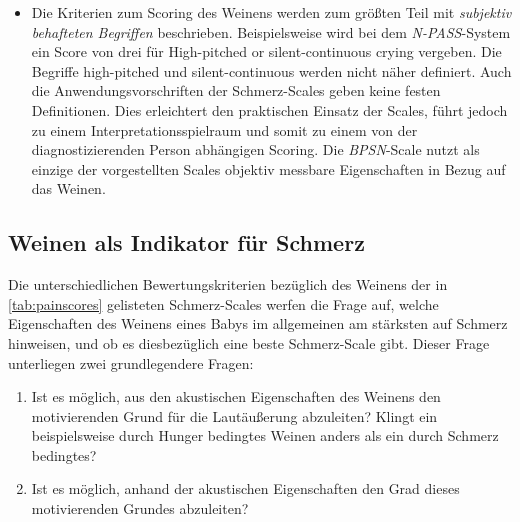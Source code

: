 \begin{itemize}
	\item Die Kriterien zum Scoring des Weinens werden zum größten Teil mit \emph{subjektiv behafteten Begriffen} beschrieben. Beispielsweise wird bei dem \emph{N-PASS}-System ein Score von drei für \glqq High-pitched or silent-continuous crying\grqq{} vergeben. Die Begriffe \glqq high-pitched\grqq{} und \glqq silent-continuous\grqq{} werden nicht näher definiert. Auch die Anwendungsvorschriften der Schmerz-Scales geben keine festen Definitionen. Dies erleichtert den praktischen Einsatz der Scales, führt jedoch zu einem Interpretationsspielraum und somit zu einem von der diagnostizierenden Person abhängigen Scoring. Die \emph{BPSN}-Scale nutzt als einzige der vorgestellten Scales objektiv messbare Eigenschaften in Bezug auf das Weinen.
	
	
\end{itemize}


\subsection{Weinen als Indikator für Schmerz}
\label{sec:foundations_cryingMeta}

Die unterschiedlichen Bewertungskriterien bezüglich des Weinens der in \autoref{tab:painscores} gelisteten Schmerz-Scales werfen die Frage auf, welche Eigenschaften des Weinens eines Babys im allgemeinen am stärksten auf Schmerz hinweisen, und ob es diesbezüglich eine \glqq beste\grqq{} Schmerz-Scale gibt. Dieser Frage unterliegen zwei grundlegendere Fragen:

\begin{enumerate}
	\item Ist es möglich, aus den akustischen Eigenschaften des Weinens den motivierenden Grund für die Lautäußerung abzuleiten?  Klingt ein beispielsweise durch Hunger bedingtes Weinen anders als ein durch Schmerz bedingtes?
	\item Ist es möglich, anhand der akustischen Eigenschaften den \glqq Grad\grqq{} dieses motivierenden Grundes abzuleiten?
\end{enumerate}

